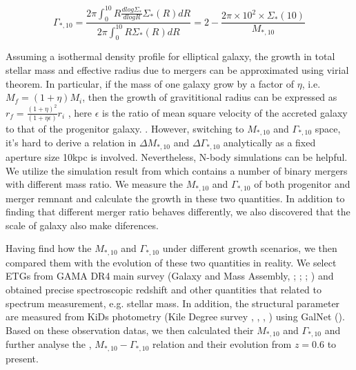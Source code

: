 \documentclass[fleqn,usenatbib]{mnras}
\begin{document}
\begin{equation}
    \label{eq:gammastar10}
    \Gamma_{*,10} = \frac{2\pi \int_0^{10} R \frac{dlog\Sigma_*}{dlogR}\Sigma_*(R)dR}{2\pi \int_0^{10}R\Sigma_*(R)dR} = 2 - \frac{2\pi \times 10^2 \times \Sigma_*(10)}{M_{*,10}}
\end{equation} 
\par Assuming a isothermal density profile for elliptical galaxy, the growth in total stellar mass and effective radius due to mergers can be approximated using virial theorem\citep{naab_minor_2009}. In particular, if the mass of one galaxy grow by a factor of $\eta$, i.e. $M_f = (1+\eta) M_i$, then the growth of gravititional radius can be expressed as $r_f = \frac{(1+\eta)^2}{(1+\eta \epsilon)} r_i$ , here $\epsilon$ is the ratio of mean square velocity of the accreted galaxy to that of the progenitor galaxy.
 . However, switching to $M_{*,10}$ and $\Gamma_{*,10}$ space, it's hard to derive a relation in $\Delta M_{*,10}$ and $\Delta \Gamma_{*,10}$ analytically as a fixed aperture size 10kpc is involved. Nevertheless, N-body simulations can be helpful. We utilize the simulation result from \cite{nipoti2009} which contains a number of binary mergers with different mass ratio. We measure the $M_{*,10}$ and $\Gamma_{*,10}$ of both progenitor and merger remnant and calculate the growth in these two quantities. In addition to finding that different merger ratio behaves differently, we also discovered that the scale of galaxy also make diferences. 
\par Having find how the $M_{*,10}$ and $\Gamma_{*,10}$ under different growth scenarios, we then compared them with the evolution of these two quantities in reality. We select ETGs from GAMA DR4 main survey (Galaxy and Mass Assembly, \cite{GAMAmain};\cite{bellstedt_galaxy_2020} ; \cite{GAMA1}; \cite{GAMA2}) and obtained precise spectroscopic redshift and other quantities that related to spectrum measurement, e.g. stellar mass. In addition, 
the structural parameter are measured from KiDs photometry (Kile Degree survey , \cite{kuijken_fourth_2019}, \cite{KiDs_Roy}, \cite{Amaro_rejection_2021}) using GalNet (\cite{GaLNet2022}). Based on these observation datas,  we then calculated their $M_{*,10} $ and $\Gamma_{*,10}$ and further analyse the , $M_{*,10} - \Gamma_{*,10}$ relation and their evolution from $z = 0.6$ to present. 
\end{document}
